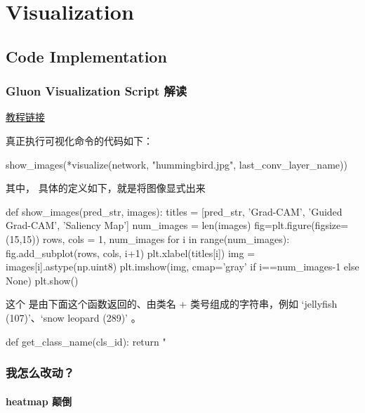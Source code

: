 %

\chapter{Visualization}

\section{Code Implementation}

\subsection{Gluon Visualization Script 解读}

\href{https://mxnet.apache.org/versions/1.4.1/tutorials/vision/cnn_visualization.html}{教程链接}


真正执行可视化命令的代码如下：
\begin{python}
show_images(*visualize(network, "hummingbird.jpg", last_conv_layer_name))
\end{python}

\noindent 其中， 具体的定义如下，就是将图像显式出来
\begin{python}
def show_images(pred_str, images):
    titles = [pred_str, 'Grad-CAM', 'Guided Grad-CAM', 'Saliency Map']
    num_images = len(images)
    fig=plt.figure(figsize=(15,15))
    rows, cols = 1, num_images
    for i in range(num_images):
        fig.add_subplot(rows, cols, i+1)
        plt.xlabel(titles[i])
        img = images[i].astype(np.uint8)
        plt.imshow(img, cmap='gray' if i==num_images-1 else None)
    plt.show()
\end{python}

这个  是由下面这个函数返回的、由类名 + 类号组成的字符串，例如 `jellyfish (107)'、`snow leopard (289)' 。

\begin{python}
def get_class_name(cls_id):
    return "%
\end{python}

\subsection{我怎么改动？}

\subsubsection{heatmap 颠倒}

